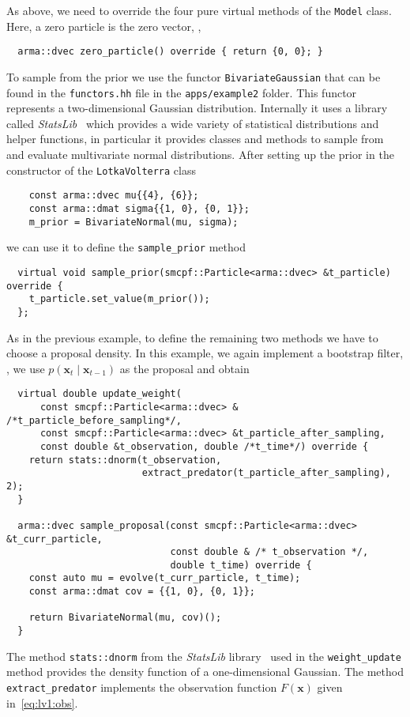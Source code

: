 \begin{example}
  As above, we need to override the four pure virtual methods of the
  \texttt{Model} class. Here, a zero particle is the zero vector, \ie,
\begin{verbatim}
  arma::dvec zero_particle() override { return {0, 0}; }
\end{verbatim}
  To sample from the prior we use the functor
  \texttt{BivariateGaussian} that can be found in the
  \texttt{functors.hh} file in the \texttt{apps/example2} folder. This
  functor represents a two-dimensional Gaussian
  distribution. Internally it uses a library called
  \emph{StatsLib}~\cite{stats} which provides a wide variety of
  statistical distributions and helper functions, in particular it
  provides classes and methods to sample from and evaluate
  multivariate normal distributions. After setting up the prior in the
  constructor of the \texttt{LotkaVolterra} class
\begin{verbatim}
    const arma::dvec mu{{4}, {6}};
    const arma::dmat sigma{{1, 0}, {0, 1}};
    m_prior = BivariateNormal(mu, sigma);
\end{verbatim}
  we can use it to define the \texttt{sample\_prior} method
\begin{verbatim}
  virtual void sample_prior(smcpf::Particle<arma::dvec> &t_particle) override {
    t_particle.set_value(m_prior());
  };
\end{verbatim}
  As in the previous example, to define the remaining two methods we
  have to choose a proposal density. In this example, we again
  implement a bootstrap filter, \ie, we use
  $p(\bm{x}_t \mid \bm{x}_{t-1})$ as the proposal and obtain
\begin{verbatim}
  virtual double update_weight(
      const smcpf::Particle<arma::dvec> & /*t_particle_before_sampling*/,
      const smcpf::Particle<arma::dvec> &t_particle_after_sampling,
      const double &t_observation, double /*t_time*/) override {
    return stats::dnorm(t_observation,
                        extract_predator(t_particle_after_sampling), 2);
  }

  arma::dvec sample_proposal(const smcpf::Particle<arma::dvec> &t_curr_particle,
                             const double & /* t_observation */,
                             double t_time) override {
    const auto mu = evolve(t_curr_particle, t_time);
    const arma::dmat cov = {{1, 0}, {0, 1}};

    return BivariateNormal(mu, cov)();
  }
\end{verbatim}
  The method \texttt{stats::dnorm} from the \emph{StatsLib}
  library~\cite{stats} used in the \texttt{weight\_update} method
  provides the density function of a one-dimensional Gaussian. The
  method \texttt{extract\_predator} implements the observation
  function $F(\bm{x})$ given in~\eqref{eq:lv1:obs}.


\end{example}
